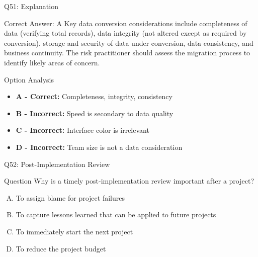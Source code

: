\documentclass{beamer}
\begin{document}
	\begin{frame}{Q51: Explanation}
		\begin{block}{Correct Answer: A}
			Key data conversion considerations include completeness of data (verifying total records), data integrity (not altered except as required by conversion), storage and security of data under conversion, data consistency, and business continuity. The risk practitioner should assess the migration process to identify likely areas of concern.
		\end{block}
		\begin{block}{Option Analysis}
			\begin{itemize}
				\item \textbf{A - Correct:} Completeness, integrity, consistency
				\item \textbf{B - Incorrect:} Speed is secondary to data quality
				\item \textbf{C - Incorrect:} Interface color is irrelevant
				\item \textbf{D - Incorrect:} Team size is not a data consideration
			\end{itemize}
		\end{block}
	\end{frame}
	
	\begin{frame}{Q52: Post-Implementation Review}
		\begin{block}{Question}
			Why is a timely post-implementation review important after a project?
		\end{block}
		\begin{enumerate}[(A)]
			\item To assign blame for project failures
			\item To capture lessons learned that can be applied to future projects
			\item To immediately start the next project
			\item To reduce the project budget
		\end{enumerate}
	\end{frame}
	
\end{document}
